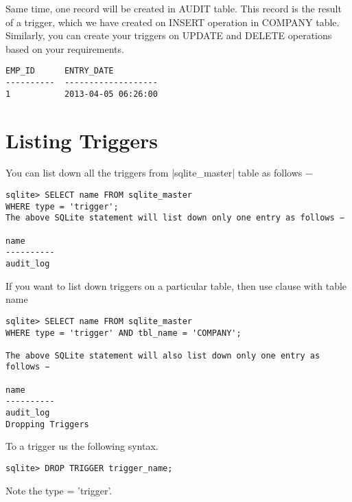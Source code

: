 Same time, one record will be created in AUDIT table. This record is the result of a trigger, which we have created on INSERT operation in COMPANY table. Similarly, you can create your triggers on UPDATE and DELETE operations based on your requirements.

\begin{verbatim}
EMP_ID      ENTRY_DATE
----------  -------------------
1           2013-04-05 06:26:00
\end{verbatim}



\section{Listing Triggers}

You can list down all the triggers from |sqlite_master| table as follows −


\begin{verbatim}
sqlite> SELECT name FROM sqlite_master
WHERE type = 'trigger';
The above SQLite statement will list down only one entry as follows −

name
----------
audit_log
\end{verbatim}



If you want to list down triggers on a particular table, then use  clause with table name

\begin{verbatim}
sqlite> SELECT name FROM sqlite_master
WHERE type = 'trigger' AND tbl_name = 'COMPANY';

The above SQLite statement will also list down only one entry as follows −

name
----------
audit_log
Dropping Triggers
\end{verbatim}


To  a trigger us the following syntax.

\begin{verbatim}
sqlite> DROP TRIGGER trigger_name;
\end{verbatim}

Note the type = 'trigger'. 




